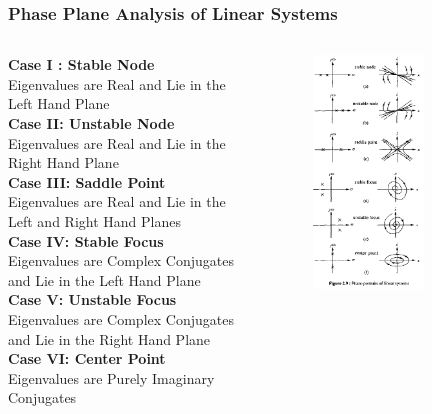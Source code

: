 \documentclass[11pt,handout]{beamer}   %
\begin{document}
\begin{frame}
\frametitle{Phase Plane Analysis of Linear Systems}
\begin{columns}
\begin{column}{0.5\textwidth}
\textbf{Case I : Stable Node}\\
\small{Eigenvalues are Real and Lie in the Left Hand Plane}\\
\textbf{Case II: Unstable Node}\\
\small{Eigenvalues are Real and Lie in the Right Hand Plane}\\
\textbf{Case III: Saddle Point}\\
\small{Eigenvalues are Real and Lie in the Left and Right Hand Planes}\\
\textbf{Case IV: Stable Focus}\\
\small{Eigenvalues are Complex Conjugates and Lie in the Left Hand Plane}\\
\textbf{Case V: Unstable Focus}\\
\small{Eigenvalues are Complex Conjugates and Lie in the Right Hand Plane}\\
\textbf{Case VI: Center Point}\\
\small{Eigenvalues are Purely Imaginary Conjugates}\\
\end{column}
\begin{column}{0.5\textwidth}
\begin{figure}
\centering
\includegraphics[width=0.7\textwidth]{Figures/Linear_Systems_1.PNG}

\end{figure}
\end{column}
\end{columns}
\end{frame}
\end{document}
